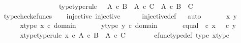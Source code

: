 \begin{isabellebody}
\ \ \ \ \ \ \ \ \ \ \ \ \ \ \ \ \ {\isasymphi}{\isacharunderscore}{\kern0pt}type{\isacharbrackleft}{\kern0pt}type{\isacharunderscore}{\kern0pt}rule{\isacharbrackright}{\kern0pt}{\isacharcolon}{\kern0pt}\ {\isachardoublequoteopen}{\isasymphi}\ {\isacharcolon}{\kern0pt}\ {\isacharparenleft}{\kern0pt}A\ {\isasymtimes}\isactrlsub c\ B{\isacharparenright}{\kern0pt}\ {\isasymCoprod}\ {\isacharparenleft}{\kern0pt}A\ {\isasymtimes}\isactrlsub c\ C{\isacharparenright}{\kern0pt}\ {\isasymrightarrow}\ A\ {\isasymtimes}\isactrlsub c\ {\isacharparenleft}{\kern0pt}B\ {\isasymCoprod}\ C{\isacharparenright}{\kern0pt}{\isachardoublequoteclose}\isanewline
\ \ \ \ \isamarkupfalse%
\ typecheck{\isacharunderscore}{\kern0pt}cfuncs\isanewline
\isanewline
\ \ \isamarkupfalse%
\ injective{\isacharcolon}{\kern0pt}\ {\isachardoublequoteopen}injective{\isacharparenleft}{\kern0pt}{\isasymphi}{\isacharparenright}{\kern0pt}{\isachardoublequoteclose}\isanewline
\ \ \ \ \isamarkupfalse%
\ injective{\isacharunderscore}{\kern0pt}def\isanewline
\ \ \isamarkupfalse%
{\isacharparenleft}{\kern0pt}auto{\isacharparenright}{\kern0pt}\ \isanewline
\ \ \ \ \isamarkupfalse%
\ x\ y\isanewline
\ \ \ \ \isamarkupfalse%
\ x{\isacharunderscore}{\kern0pt}type{\isacharcolon}{\kern0pt}\ {\isachardoublequoteopen}x\ {\isasymin}\isactrlsub c\ domain\ {\isasymphi}{\isachardoublequoteclose}\isanewline
\ \ \ \ \isamarkupfalse%
\ y{\isacharunderscore}{\kern0pt}type{\isacharcolon}{\kern0pt}\ {\isachardoublequoteopen}y\ {\isasymin}\isactrlsub c\ domain\ {\isasymphi}{\isachardoublequoteclose}\isanewline
\ \ \ \ \isamarkupfalse%
\ equal{\isacharcolon}{\kern0pt}\ {\isachardoublequoteopen}{\isasymphi}\ {\isasymcirc}\isactrlsub c\ x\ {\isacharequal}{\kern0pt}\ {\isasymphi}\ {\isasymcirc}\isactrlsub c\ y{\isachardoublequoteclose}\isanewline
\isanewline
\ \ \ \ \isamarkupfalse%
\ x{\isacharunderscore}{\kern0pt}type{\isacharbrackleft}{\kern0pt}type{\isacharunderscore}{\kern0pt}rule{\isacharbrackright}{\kern0pt}{\isacharcolon}{\kern0pt}\ {\isachardoublequoteopen}x\ {\isasymin}\isactrlsub c\ {\isacharparenleft}{\kern0pt}A\ {\isasymtimes}\isactrlsub c\ B{\isacharparenright}{\kern0pt}\ {\isasymCoprod}\ {\isacharparenleft}{\kern0pt}A\ {\isasymtimes}\isactrlsub c\ C{\isacharparenright}{\kern0pt}{\isachardoublequoteclose}\isanewline
\ \ \ \ \ \ \isamarkupfalse%
\ cfunc{\isacharunderscore}{\kern0pt}type{\isacharunderscore}{\kern0pt}def\ {\isasymphi}{\isacharunderscore}{\kern0pt}type\ x{\isacharunderscore}{\kern0pt}type\ \isamarkupfalse%

\end{isabellebody}
